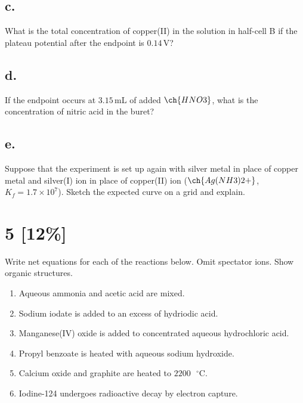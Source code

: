 \documentclass[11pt]{article}
\begin{document}
\subsection*{c.} What is the total concentration of copper(II) in the solution in half-cell B if the plateau potential after the endpoint is $0.14\,\text{V}$?
\vspace{3cm}

\subsection*{d.} If the endpoint occurs at $3.15\,\text{mL}$ of added $\ch{HNO3}$, what is the concentration of nitric acid in the buret?
\vspace{3cm}

\subsection*{e.} Suppose that the experiment is set up again with silver metal in place of copper metal and silver(I) ion in place of copper(II) ion ($\ch{Ag(NH3)2+}$, $K_f = 1.7\times10^7$). Sketch the expected curve on a grid and explain.
\vspace{4cm}

\newpage
\section{5 [12\%]}
Write net equations for each of the reactions below. Omit spectator ions. Show organic structures.
\begin{enumerate}[label=\alph*.]
    \item Aqueous ammonia and acetic acid are mixed.
    \vspace{1.5cm}
    \item Sodium iodate is added to an excess of hydriodic acid.
    \vspace{1.5cm}
    \item Manganese(IV) oxide is added to concentrated aqueous hydrochloric acid.
    \vspace{1.5cm}
    \item Propyl benzoate is heated with aqueous sodium hydroxide.
    \vspace{1.5cm}
    \item Calcium oxide and graphite are heated to $2200\text{ }^{\circ}\text{C}$.
    \vspace{1.5cm}
    \item Iodine-124 undergoes radioactive decay by electron capture.
    \vspace{1.5cm}
\end{enumerate}
\end{document}
